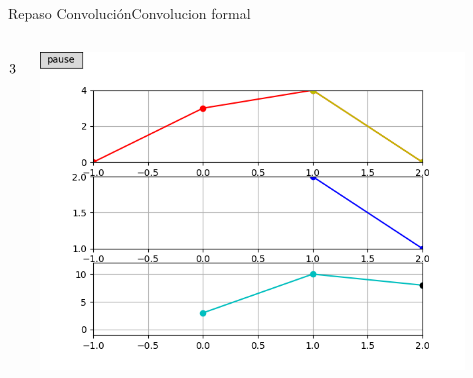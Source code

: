 \begin{frame}{Repaso Convolución}{Convolucion formal}
\begin{columns}[c]
\begin{column}{0.4\textwidth}
\begin{align*}
               \cline{1-2}
               3 \hspace{1cm} 10 \hspace{1cm} 8\\
            \end{align*}
      \end{column}
      \hspace{2pt}
      \vrule
      \hspace{2pt}
      \begin{column}{0.6\textwidth}
         \centering\includegraphics[width=0.9\textwidth]{5_clase/conv_as_multiply2}
      \end{column}
   \end{columns}
   \vfill
\end{frame}
